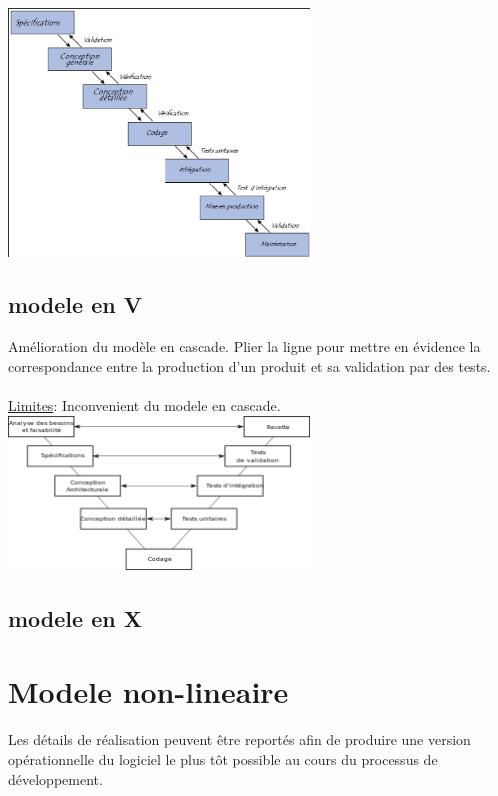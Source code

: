 \documentclass[a4paper,12pt,openany]{book}
\begin{document}
\includegraphics[width=0.60\textwidth,center]{img/cycle_en_cascade.png}


\subsection{modele en V}

Amélioration du modèle en cascade. Plier la ligne pour mettre en évidence la correspondance entre la production d’un produit et sa validation par des tests.\\
\\
\underline{Limites}: Inconvenient du modele en cascade.\\

\includegraphics[width=0.60\textwidth,center]{img/cycle_en_v.png}


\subsection{modele en X}



\section{Modele non-lineaire}

Les détails de réalisation peuvent être reportés afin de produire une version opérationnelle du logiciel le plus tôt possible au cours du processus de développement.\\
\end{document}
